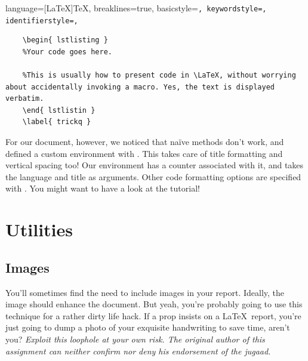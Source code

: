 \documentclass[10pt, Computer Modern]{article}
\begin{document}
	\lstset
	{
    language=[LaTeX]TeX,
    breaklines=true,
    basicstyle=\tt\scriptsize,
    keywordstyle=\color{blue},
    identifierstyle=\color{magenta},
	}
	\begin{lstlisting}
	\begin{ lstlisting }
	%Your code goes here.

	%This is usually how to present code in \LaTeX, without worrying about accidentally invoking a macro. Yes, the text is displayed verbatim.
	\end{ lstlistin }
	\label{ trickq }
	\end{lstlisting}

	


	For our document, however, we noticed that na\"ive methods don’t work, and defined a custom environment with \lstnewenvironment. This takes care of title formatting and vertical spacing too! Our environment has a counter associated with it, and takes the language and title as arguments. Other code formatting options are specified with \lstset{...}. You might want to have a look at the tutorial!

\clearpage

\section{Utilities}
\label{utils}
	\subsection{Images}


	You'll sometimes find the need to include images in your report. Ideally, the image should enhance the document. But yeah, you're probably going to use this technique for a rather dirty life hack. If a prop insists on a \LaTeX\ report, you're just going to dump a photo of your exquisite handwriting to save time, aren't you? \textit{Exploit this loophole at your own risk. The original author of this assignment can neither confirm nor deny his endorsement of the jugaad.}
	
\end{document}
